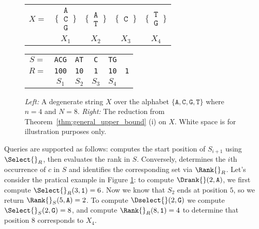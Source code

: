 \begin{figure}[h!]
    \centering

    \begin{tabular}{c@{\hskip 0.5em}c@{\hskip 0.5em}c@{\hskip 0.5em}c@{\hskip 0.5em}c}
        $X = $                                                               & $\Bigg\{\,\begin{matrix}\texttt{A}\\\texttt{C}\\\texttt{G}\end{matrix}\,\Bigg\}$ &
        $\Bigg\{\,\begin{matrix}\texttt{A}\\\texttt{T}\end{matrix}\,\Bigg\}$ &
        $\Bigg\{\,\begin{matrix}\texttt{C}\end{matrix}\,\Bigg\}$             &
        $\Bigg\{\,\begin{matrix}\texttt{T}\\\texttt{G}\end{matrix}\,\Bigg\}$                                                                                                            \\
                                                                             & $X_1$                                                                            & $X_2$ & $X_3$ & $X_4$
    \end{tabular}\qquad\begin{tabular}{c@{\hskip 0.5em}c@{\hskip 0.5em}c@{\hskip 0.5em}c@{\hskip 0.5em}c@{\hskip 0.5em}c}
        $S =$  & \texttt{ACG} & \texttt{AT} & \texttt{C} & \texttt{TG} &            \\
        $R = $ & \texttt{100} & \texttt{10} & \texttt{1} & \texttt{10} & \texttt{1} \\
               & $S_1$        & $S_2$       & $S_3$      & $S_4$
    \end{tabular}
    \caption{\emph{Left:} A degenerate string $X$ over the alphabet $\{\texttt{A}, \texttt{C}, \texttt{G}, \texttt{T}\}$ where $n = 4$ and $N = 8$. \emph{Right:} The reduction from Theorem~\ref{thm:general_upper_bound} (i) on $X$. White space is for illustration purposes only.}
    \label{fig:reduction_example}
\end{figure}

\noindent Queries are supported as follows: \Drank{} computes the start position of $S_{i+1}$ using $\Select{}_R$, then evaluates the rank in $S$. Conversely, \Dselect{} determines the $i$th occurrence of $c$ in $S$ and identifies the corresponding set via $\Rank{}_R$. Let's consider the pratical example in Figure \ref{fig:reduction_example}: to compute $\Drank{}(2,\texttt{A})$, we first compute $\Select{}_R(3,\texttt{1}) = 6$. Now we know that $S_2$ ends at position $5$, so we return $\Rank{}_S(5, \texttt{A}) = 2$. To compute $\Dselect{}(2, \texttt{G})$ we compute $\Select{}_S(2,\texttt{G}) = 8$, and compute $\Rank{}_R(8,\texttt{1}) = 4$ to determine that position 8 corresponds to $X_4$.


